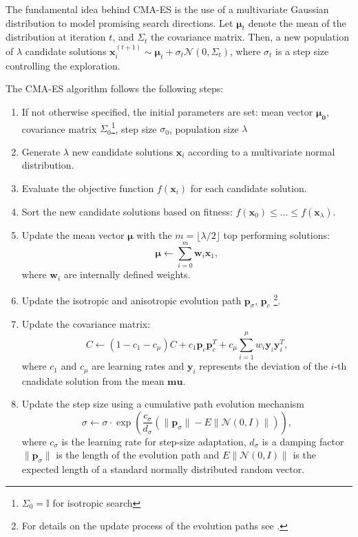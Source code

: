 The fundamental idea behind CMA-ES is the use of a multivariate Gaussian distribution to model promising search directions. 
Let $\mathbf{\mu}_t$ denote the mean of the distribution at iteration $t$, and $\Sigma_t$ the covariance matrix. 
Then, a new population of $\lambda$ candidate solutions $\mathbf{x}_i^(t+1) \sim \mathbf{\mu}_t + \sigma_t\mathcal{N}(0, \Sigma_t)$, where $\sigma_t$ is a step size controlling the exploration.  

The CMA-ES algorithm follows the following steps:\begin{enumerate}
    \item If not otherwise specified, the initial parameters are set: mean vector $\mathbf{\mu_0}$, covariance matrix $\Sigma_0$\footnote{$\Sigma_0=\mathbb{I}$ for isotropic search}, step size $\sigma_0$, population size $\lambda$
    \item Generate $\lambda$ new candidate solutions $\mathbf{x}_i$ according to a multivariate normal distribution.
    \item Evaluate the objective function $f(\mathbf{x}_i)$ for each candidate solution.
    \item Sort the new candidate solutions based on fitness: $f(\mathbf{x}_0) \leq ... \leq f(\mathbf{x}_{\lambda})$.
    \item Update the mean vector $\mathbf{\mu}$ with the $m=\lfloor \lambda / 2 \rfloor$ top performing solutions:\begin{equation}
        \mathbf{\mu} \leftarrow \sum_{i=0}^m \mathbf{w}_i\mathbf{x}_1,
    \end{equation} where $\mathbf{w}_i$ are internally defined weights.
    \item Update the isotropic and anisotropic evolution path $\mathbf{p}_{\sigma}$, $\mathbf{p}_c$ \footnote{For details on the update process of the evolution paths see \cite{cmaessimplepractical}.}.
    \item Update the covariance matrix: \begin{equation}
        C \leftarrow (1 - c_1 - c_{\mu}) C + c_1 \mathbf{p}_c \mathbf{p}_c^T + c_{\mu} \sum_{i=1}^{\mu} w_i \mathbf{y}_i \mathbf{y}_i^T,
    \end{equation} where $c_1$ and $c_\mu$ are learning rates and $\mathbf{y}_i$ represents the deviation of the $i$-th cnadidate solution from the mean $\mathbf{mu}$.
    \item Update the step size using a cumulative path evolution mechanism \begin{equation}
        \sigma \leftarrow \sigma \cdot \exp \left( \frac{c_{\sigma}}{d_{\sigma}} \left( \| \mathbf{p}_{\sigma} \| - E \| \mathcal{N}(0, I) \| \right) \right),
    \end{equation} where $c_\sigma$ is the learning rate for step-size adaptation, $d_\sigma$ is a damping factor $\| \mathbf{p}_{\sigma} \|$ is the length of the evolution path and $E \| \mathcal{N}(0, I) \|$ is the expected length of a standard normally distributed random vector.
\end{enumerate}

